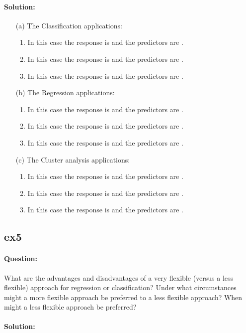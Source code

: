 \documentclass[a4paper,12pt,titlepage]{article} %
\begin{document}
\paragraph{Solution:}
\begin{itemize}
	\item[(a)] The Classification applications: 
	\begin{enumerate}
		\item In this case the response is and the predictors are .
		\item In this case the response is and the predictors are .
		\item In this case the response is and the predictors are .
	\end{enumerate}
	\item[(b)] The Regression applications: 
	\begin{enumerate}
		\item In this case the response is and the predictors are .
		\item In this case the response is and the predictors are .
		\item In this case the response is and the predictors are .
	\end{enumerate}
	\item[(c)] The Cluster analysis applications: 
	\begin{enumerate}
		\item In this case the response is and the predictors are .
		\item In this case the response is and the predictors are .
		\item In this case the response is and the predictors are .
	\end{enumerate}
\end{itemize}


\subsection{ex5}
\paragraph{Question:} What are the advantages and disadvantages of a very flexible (versus a less flexible) approach for regression or classification? Under what circumstances might a more flexible approach be preferred to a less flexible approach? When might a less flexible approach be preferred?

\paragraph{Solution:}
\end{document}
